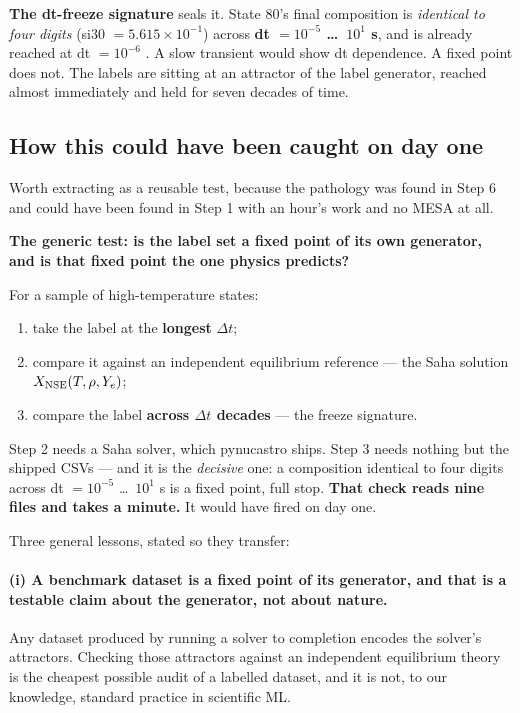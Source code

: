 \textbf{The dt-freeze signature} seals it. State 80's final composition is
\emph{identical to four digits} (si30 $= 5.615 \times 10^{-1}$) across
\textbf{dt $= 10^{-5}$ \ldots\ $10^{1}$ s}, and is already reached at
dt $= 10^{-6}$ . A slow transient would show dt
dependence. A fixed point does not. The labels are sitting at an attractor of
the label generator, reached almost immediately and held for seven decades of
time.

\subsection{How this could have been caught on day one}
\label{sec:dayone}

Worth extracting as a reusable test, because the pathology was found in Step 6
and could have been found in Step 1 with an hour's work and no MESA at all.

\textbf{The generic test: is the label set a fixed point of its own generator,
and is that fixed point the one physics predicts?}

For a sample of high-temperature states:

\begin{enumerate}
\item take the label at the \textbf{longest} $\Delta t$;
\item compare it against an independent equilibrium reference --- the Saha
  solution $X_{\mathrm{NSE}}(T, \rho, Y_{e})$;
\item compare the label \textbf{across $\Delta t$ decades} --- the freeze
  signature.
\end{enumerate}

Step 2 needs a Saha solver, which pynucastro ships. Step 3 needs nothing but
the shipped CSVs --- and it is the \emph{decisive} one: a composition identical
to four digits across dt $= 10^{-5}$ \ldots\ $10^{1}$ s is a fixed point, full
stop. \textbf{That check reads nine files and takes a minute.} It would have
fired on day one.

Three general lessons, stated so they transfer:

\paragraph{(i) A benchmark dataset is a fixed point of its generator, and that
is a testable claim about the generator, not about nature.} Any dataset
produced by running a solver to completion encodes the solver's attractors.
Checking those attractors against an independent equilibrium theory is the
cheapest possible audit of a labelled dataset, and it is not, to our knowledge,
standard practice in scientific ML.


